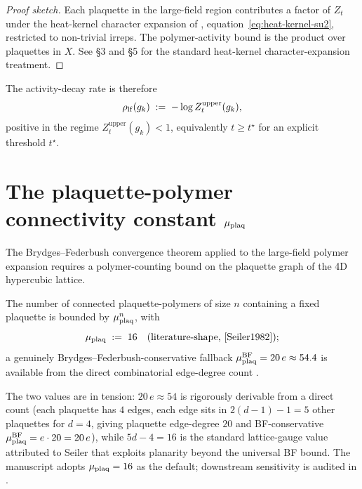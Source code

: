 \begin{proof}[Proof sketch]
Each plaquette in the large-field region contributes a factor of
$Z_t$ under the heat-kernel character expansion of
, equation~\eqref{eq:heat-kernel-su2},
restricted to non-trivial irreps.  The polymer-activity bound is
the product over plaquettes in $X$.  See
\cite{DrouffeItzykson1978} \S3 and \cite{ItzyksonDrouffe1989}
\S5 for the standard heat-kernel character-expansion treatment.
\end{proof}

The activity-decay rate is therefore
\begin{equation}
  \label{eq:rho-lf}
  \rho_{\mathrm{lf}}(g_k) \;:=\; -\log Z_t^{\mathrm{upper}}(g_k),
\end{equation}
positive in the regime $Z_t^{\mathrm{upper}}(g_k) < 1$, equivalently
$t \ge t^\star$ for an explicit threshold $t^\star$.

\section{The plaquette-polymer connectivity constant
  \texorpdfstring{$\mu_{\mathrm{plaq}}$}{mu\_plaq}}
\label{sec:mu-plaq}

The Brydges--Federbush convergence theorem applied to the
large-field polymer expansion requires a polymer-counting bound on
the plaquette graph of the 4D hypercubic lattice.

\begin{convention}
\label{conv:mu-plaq}
The number of connected plaquette-polymers of size $n$ containing a
fixed plaquette is bounded by $\mu_{\mathrm{plaq}}^n$, with
\begin{equation}
  \label{eq:mu-plaq-default}
  \mu_{\mathrm{plaq}} \;:=\; 16
  \quad \text{(literature-shape, \cite{Seiler1982})};
\end{equation}
a genuinely Brydges--Federbush-conservative fallback
$\mu_{\mathrm{plaq}}^{\mathrm{BF}} = 20\,e \approx 54.4$ is available from the
direct combinatorial edge-degree count
\cite{BrydgesFroehlichSeiler1978IHES}.
\end{convention}

The two values are in tension: $20\,e \approx 54$ is rigorously
derivable from a direct count (each plaquette has $4$ edges, each
edge sits in $2(d - 1) - 1 = 5$ other plaquettes for $d = 4$, giving
plaquette edge-degree $20$ and BF-conservative
$\mu_{\mathrm{plaq}}^{\mathrm{BF}} = e \cdot 20 = 20\,e$), while $5d - 4 = 16$
is the standard lattice-gauge value attributed to Seiler that
exploits planarity beyond the universal BF bound.  The manuscript
adopts $\mu_{\mathrm{plaq}} = 16$ as the default; downstream sensitivity is
audited in .

